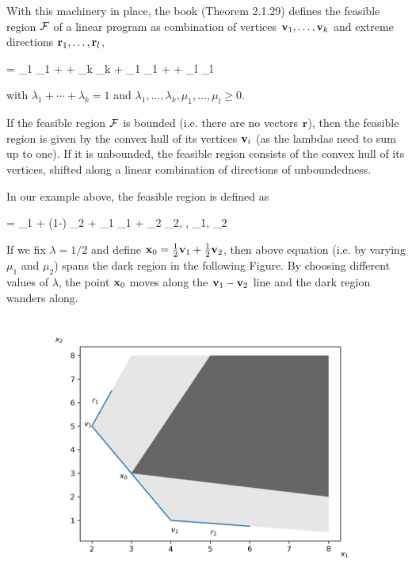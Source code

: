 With this machinery in place, the book (Theorem 2.1.29) defines the feasible region $\mathcal{F}$ of a linear program as combination of vertices $\mathbf{v}_1, \ldots, \mathbf{v}_k$ and extreme directions $\mathbf{r}_1, \ldots, \mathbf{r}_l$,

\bee
\xbf = \lambda_1 \vbf_1 + \cdots + \lambda_k \vbf_k + \mu_1 \rbf_1 + \cdots + \mu_l \rbf_l
\eee

with $\lambda_1 + \cdots + \lambda_k = 1$ and $\lambda_1, \ldots, \lambda_k, \mu_1, \ldots, \mu_l \geq 0$.

If the feasible region $\mathcal{F}$ is bounded (i.e. there are no vectors $\mathbf{r}$), then the feasible region is given by the convex hull of its vertices $\mathbf{v}_i$ (as the lambdas need to sum up to one). If it is unbounded, the feasible region consists of the convex hull of its vertices, shifted along a linear combination of directions of unboundedness.

In our example above, the feasible region is defined as

\bee
\xbf = \lambda \vbf_1 + (1-\lambda) \vbf_2 + \mu_1 \rbf_1 + \mu_2 \rbf_2, \quad \lambda, \mu_1, \mu_2 
\eee

If we fix $\lambda = 1/2$ and define $\mathbf{x}_0 = \frac{1}{2} \mathbf{v}_1 + \frac{1}{2} \mathbf{v}_2$, then above equation (i.e. by varying $\mu_1$ and $\mu_2$) spans the dark region in the following Figure. By choosing different values of $\lambda$, the point $\mathbf{x}_0$ moves along the $\mathbf{v}_1 - \mathbf{v}_2$ line and the dark region wanders along.

\begin{figure}[H]
\includegraphics[scale = 0.7]{images/2022-09-27_lin_prog_1_04.png}
\end{figure}


